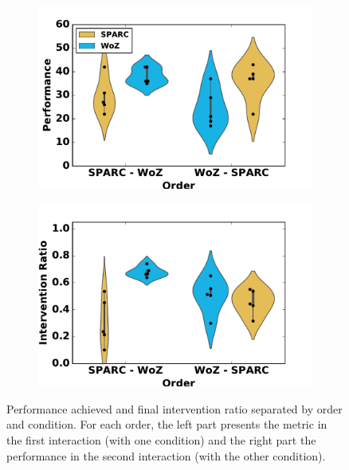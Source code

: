 \begin{figure}[ht]
	\centering
	\begin{subfigure}[t]{0.5\textwidth}
		\centering
		\includegraphics[width=1.\textwidth]{perf_divided.pdf}
	\end{subfigure}%
	\begin{subfigure}[t]{0.5\textwidth}
		\centering
		\includegraphics[width=1.\textwidth]{ratio_divided.pdf}
	\end{subfigure}
	\caption{Performance achieved and final intervention ratio separated by order and condition. For each order, the left part presents the metric in the first interaction (with one condition) and the right part the performance in the second interaction (with the other condition).}
	\label{fig:woz_separated}
\end{figure}



